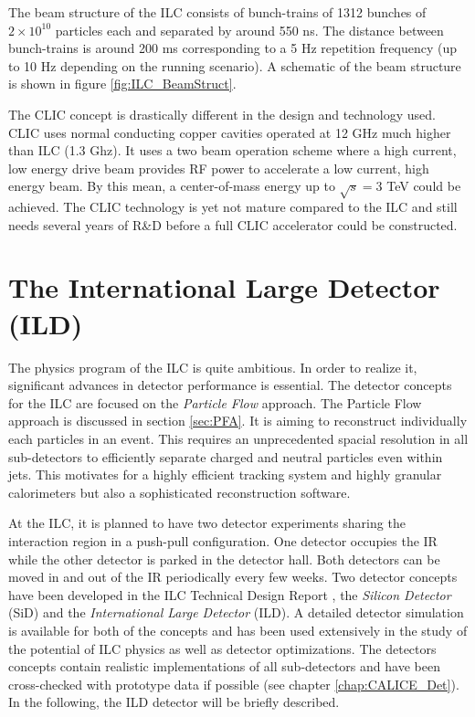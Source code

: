 The beam structure of the ILC consists of bunch-trains of 1312 bunches of $2 \times 10^{10}$ particles each and separated by around 550 ns. The distance between bunch-trains is around 200 ms corresponding to a 5 Hz repetition frequency (up to 10 Hz depending on the running scenario). A schematic of the beam structure is shown in figure \ref{fig:ILC_BeamStruct}.

The CLIC concept \cite{CLIC_CDR} is drastically different in the design and technology used. CLIC uses normal conducting copper cavities operated at 12 GHz much higher than ILC (1.3 Ghz). It uses a two beam operation scheme where a high current, low energy drive beam provides RF power to accelerate a low current, high energy beam. By this mean, a center-of-mass energy up to $\sqrt{s} = 3$ TeV could be achieved. The CLIC technology is yet not mature compared to the ILC and still needs several years of R\&D before a full CLIC accelerator could be constructed.

\section{The International Large Detector (ILD)}
\label{sec:ILD}

The physics program of the ILC is quite ambitious. In order to realize it, significant advances in detector performance is essential. The detector concepts for the ILC are focused on the \textit{Particle Flow} approach. The Particle Flow approach is discussed in section \ref{sec:PFA}. It is aiming to reconstruct individually each particles in an event. This requires an unprecedented spacial resolution in all sub-detectors to efficiently separate charged and neutral particles even within jets. This motivates for a highly efficient tracking system and highly granular calorimeters but also a sophisticated reconstruction software.

At the ILC, it is planned to have two detector experiments sharing the interaction region in a push-pull configuration. One detector occupies the IR while the other detector is parked in the detector hall. Both detectors can be moved in and out of the IR periodically every few weeks. Two detector concepts have been developed in the ILC Technical Design Report \cite{ILC_TDR_Vol4}, the \textit{Silicon Detector} (SiD) and the \textit{International Large Detector} (ILD). A detailed detector simulation is available for both of the concepts and has been used extensively in the study of the potential of ILC physics as well as detector optimizations. The detectors concepts contain realistic implementations of all sub-detectors and have been cross-checked with prototype data if possible (see chapter \ref{chap:CALICE_Det}). In the following, the ILD detector will be briefly described.


